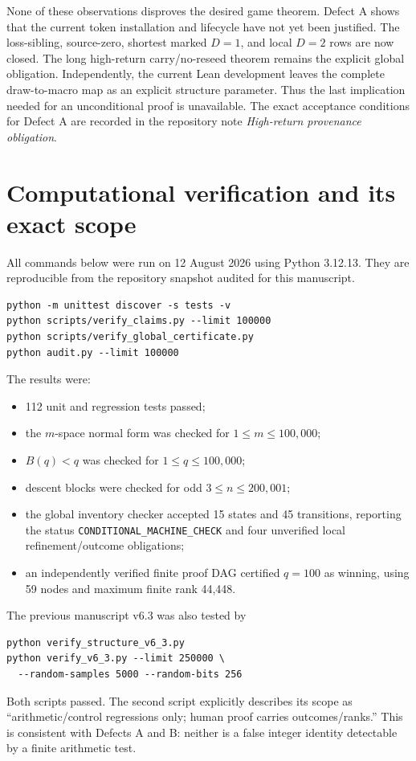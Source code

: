 \documentclass[11pt]{article}
\theoremstyle{definition}
\begin{document}
None of these observations disproves the desired game theorem.  Defect A shows
that the current token installation and lifecycle have not yet been justified.
The loss-sibling, source-zero, shortest marked $D=1$, and local $D=2$ rows
are now closed.  The long high-return carry/no-reseed theorem remains the
explicit global obligation.
Independently, the current Lean development leaves the complete draw-to-macro
map as an explicit structure parameter.  Thus the last implication needed
for an unconditional proof is unavailable.  The exact acceptance conditions
for Defect A are recorded in the repository note
\emph{High-return provenance obligation}.

\section{Computational verification and its exact scope}\label{sec:computation}

All commands below were run on 12 August 2026 using Python 3.12.13.  They are
reproducible from the repository snapshot audited for this manuscript.

\begin{verbatim}
python -m unittest discover -s tests -v
python scripts/verify_claims.py --limit 100000
python scripts/verify_global_certificate.py
python audit.py --limit 100000
\end{verbatim}

The results were:

\begin{itemize}
\item 112 unit and regression tests passed;
\item the $m$-space normal form was checked for $1\le m\le100{,}000$;
\item $B(q)<q$ was checked for $1\le q\le100{,}000$;
\item descent blocks were checked for odd $3\le n\le200{,}001$;
\item the global inventory checker accepted 15 states and 45 transitions,
      reporting the status \texttt{CONDITIONAL\_MACHINE\_CHECK} and four
      unverified local refinement/outcome obligations;
\item an independently verified finite proof DAG certified $q=100$ as
      winning, using 59 nodes and maximum finite rank 44,448.
\end{itemize}

The previous manuscript v6.3 was also tested by
\begin{verbatim}
python verify_structure_v6_3.py
python verify_v6_3.py --limit 250000 \
  --random-samples 5000 --random-bits 256
\end{verbatim}
Both scripts passed.  The second script explicitly describes its scope as
``arithmetic/control regressions only; human proof carries outcomes/ranks.''
This is consistent with Defects A and B: neither is a false integer identity
detectable by a finite arithmetic test.
\end{document}
